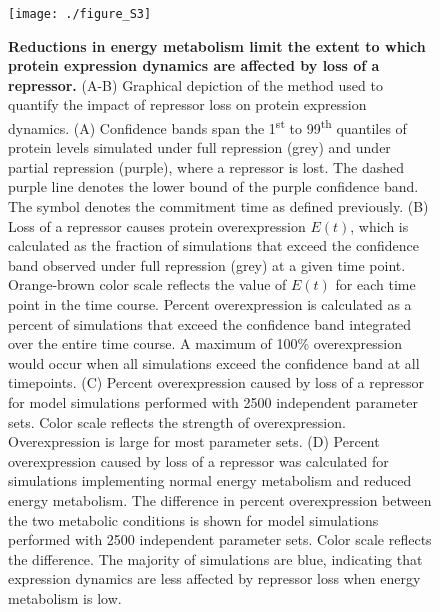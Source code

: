 \begin{figure}[h!]
\label{fig:metabolism:figS3}
\centering
\texttt{[image: ./figure\_S3]}
\caption[Reductions in energy metabolism limit the extent to which protein expression dynamics are affected by loss of a repressor.]{\textbf{Reductions in energy metabolism limit the extent to which protein expression dynamics are affected by loss of a repressor.} (A-B) Graphical depiction of the method used to quantify the impact of repressor loss on protein expression dynamics. (A) Confidence bands span the 1\textsuperscript{st} to 99\textsuperscript{th} quantiles of protein levels simulated under full repression (grey) and under partial repression (purple), where a repressor is lost. The dashed purple line denotes the lower bound of the purple confidence band. The symbol \tau denotes the commitment time as defined previously. (B) Loss of a repressor causes protein overexpression $E(t)$, which is calculated as the fraction of simulations that exceed the confidence band observed under full repression (grey) at a given time point. Orange-brown color scale reflects the value of $E(t)$ for each time point in the time course. Percent overexpression is calculated as a percent of simulations that exceed the confidence band integrated over the entire time course. A maximum of 100\% overexpression would occur when all simulations exceed the confidence band at all timepoints. (C) Percent overexpression caused by loss of a repressor for model simulations performed with 2500 independent parameter sets. Color scale reflects the strength of overexpression. Overexpression is large for most parameter sets. (D) Percent overexpression caused by loss of a repressor was calculated for simulations implementing normal energy metabolism and reduced energy metabolism. The difference in percent overexpression between the two metabolic conditions is shown for model simulations performed with 2500 independent parameter sets. Color scale reflects the difference. The majority of simulations are blue, indicating that expression dynamics are less affected by repressor loss when energy metabolism is low.}
\end{figure}

